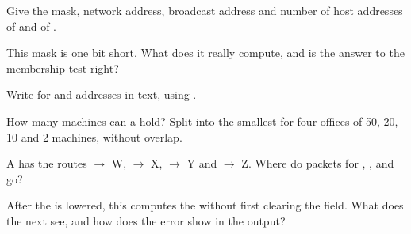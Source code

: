 \begin{exercise}[$\star$]\label{exo:b2:network-layer:1}
Give the mask, network address, broadcast address and number of host addresses of  and of
.
\end{exercise}

\begin{exercise}[$\star$]\label{exo:b2:network-layer:2}
This mask is one bit short. What  does it really compute, and is the answer to the membership test right?
\end{exercise}

\begin{exercise}[$\star$]\label{exo:b2:network-layer:3}
Write  for  and addresses in text, using .
\end{exercise}

\begin{exercise}[$\star$]\label{exo:b2:network-layer:4}
How many machines can a  hold? Split  into the smallest  for four offices of
50, 20, 10 and 2 machines, without overlap.
\end{exercise}

\begin{exercise}[$\star\star$]\label{exo:b2:network-layer:5}
A  has the routes  $\to$ W,  $\to$ X, 
$\to$ Y and  $\to$ Z. Where do packets for , ,
 and  go?
\end{exercise}

\begin{exercise}[$\star\star$]\label{exo:b2:network-layer:6}
After the  is lowered, this  computes the  without first clearing the field. What does the
next  see, and how does the error show in the output?
\end{exercise}

